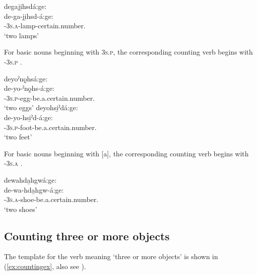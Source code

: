 \ea\label{ex:countingex900}
degaji̱hsdá:ge:\\
\gll de-ga-ji̱hsd-á:ge:\\
 {\dualic}-\textsc{3s.a}-lamp-certain.number.{\stative}\\
\glt `two lamps'
\z


For basic nouns beginning with  \textsc{3s.p}, the corresponding counting verb begins with  \textsc{\dualic-3s.p} .

\ea\label{ex:countingex101}
\ea deyoˀnǫ̱hsá:ge:\\
\gll de-yo-ˀnǫ̱hs-á:ge:\\
 {\dualic}-\textsc{3s.p}-egg-be.a.certain.number.{\stative}\\
\glt `two eggs'
\ex deyohsi̱ˀdá:ge:\\
\gll de-yo-hsi̱ˀd-á:ge:\\
 {\dualic}-\textsc{3s.p}-foot-be.a.certain.number.{\stative}\\
\glt `two feet'
\z
\z

For basic nouns beginning with [a], the corresponding counting verb begins with  \textsc{\dualic-3s.a} .

\ea\label{ex:countingex110}
dewahda̱hgwá:ge:\\
\gll de-wa-hda̱hgw-á:ge:\\
 {\dualic}-\textsc{3s.a}-shoe-be.a.certain.number.{\stative}\\
\glt `two shoes'
\z



\subsection{Counting three or more objects} \label{ch:Counting three or more objects}
The template for the verb meaning ‘three or more objects’ is shown in (\ref{ex:countingex}, also see ).

